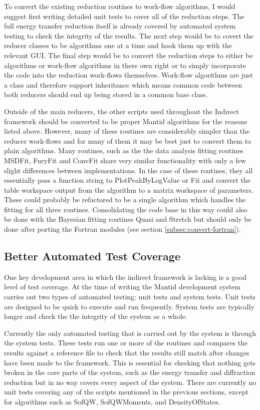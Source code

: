 \documentclass[paper=a4, fontsize=11pt]{scrartcl}	%
\numberwithin{equation}{section}															%
\numberwithin{figure}{section}																%
\numberwithin{table}{section}																%
\begin{document}
To convert the existing reduction routines to work-flow algorithms, I would suggest first writing detailed unit tests to cover all of the reduction steps. The full energy transfer reduction itself is already covered by automated system testing to check the integrity of the results. The next step would be to covert the reducer classes to be algorithms one at a time and hook them up with the relevant GUI. The final step would be to convert the reduction steps to either be algorithms or work-flow algorithms in there own right or to simply incorporate the code into the reduction work-flows themselves. Work-flow algorithms are just a class and therefore support inheritance which means common code between both reducers should end up being stored in a common base class.

Outside of the main reducers, the other scripts used throughout the Indirect framework should be converted to be proper Mantid algorithms for the reasons listed above. However, many of these routines are considerably simpler than the reducer work-flows and for many of them it may be best just to convert them to plain algorithms. Many routines, such as the the data analysis fitting routines MSDFit, FuryFit and ConvFit share very similar functionality with only a few slight differences between implementations. In the case of these routines, they all essentially pass a function string to PlotPeakByLogValue or Fit and convert the table workspace output from the algorithm to a matrix workspace of parameters. These could probably be refactored to be a single algorithm which handles the fitting for all three routines. Consolidating the code base in this way could also be done with the Bayesian fitting routines Quasi and Stretch but should only be done after porting the Fortran modules (see section \ref{subsec:convert-fortran}).

\subsection{Better Automated Test Coverage}
One key development area in which the indirect framework is lacking is a good level of test coverage. At the time of writing the Mantid development system carries out two types of automated testing: unit tests and system tests. Unit tests are designed to be quick to execute and run frequently. System tests are typically longer and check the the integrity of the system as a whole.

Currently the only automated testing that is carried out by the system is through the system tests. These tests run one or more of the routines and compares the results against a reference file to check that the results still match after changes have been made to the framework. This is essential for checking that nothing gets broken in the core parts of the system, such as the energy transfer and diffraction reduction but in no way covers every aspect of the system. There are currently no unit tests covering any of the scripts mentioned in the previous sections, except for algorithms such as SofQW, SofQWMoments, and DensityOfStates.
\end{document}

